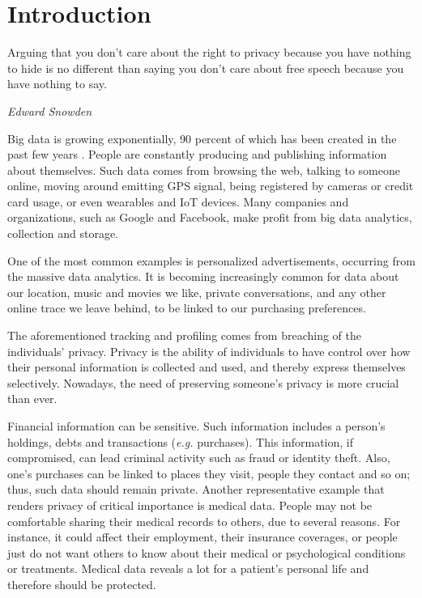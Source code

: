 \chapter{Introduction}\label{c:introduction}

\epigraph{Arguing that you don't care about the right to privacy because you have nothing to hide is no different than saying you don't care about free speech because you have nothing to say.}{\textit{Edward Snowden \cite{snowden15}}}


Big data is growing exponentially, 90 percent of which has been created in the past few years \cite{kim2014big}.
People are constantly producing and publishing information about themselves.
Such data comes from browsing the web, talking to someone online, moving around emitting GPS signal, being registered by cameras or credit card usage, or even wearables and IoT devices.
Many companies and organizations, such as Google and Facebook, make profit from big data analytics, collection and storage.

One of the most common examples is personalized advertisements, occurring from the massive data analytics.
It is becoming increasingly common for data about our location, music and movies we like, private conversations, and any other online trace we leave behind, to be linked to our purchasing preferences.

The aforementioned tracking and profiling comes from breaching of the individuals’ privacy.
Privacy is the ability of individuals to have control over how their personal information is collected and used, and thereby express themselves selectively.
Nowadays, the need of preserving someone's privacy is more crucial than ever.

Financial information can be sensitive.
Such information includes a person’s holdings, debts and transactions (\textit{e.g.} purchases).
This information, if compromised, can lead criminal activity such as fraud or identity theft.
Also, one’s purchases can be linked to places they visit, people they contact and so on; thus, such data should remain private. Another representative example that renders privacy of critical importance is medical data.
People may not be comfortable sharing their medical records to others, due to several reasons.
For instance, it could affect their employment, their insurance coverages, or people just do not want others to know about their medical or psychological conditions or treatments.
Medical data reveals a lot for a patient’s personal life and therefore should be protected.

